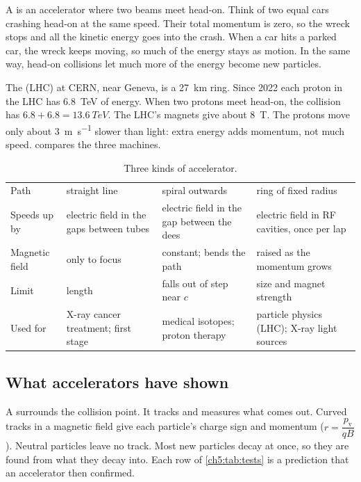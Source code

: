 A  is an accelerator where two beams meet head-on. Think of two equal cars
crashing head-on at the same speed. Their total momentum is zero, so the wreck stops and
all the kinetic energy goes into the crash. When a car hits a parked car, the wreck keeps
moving, so much of the energy stays as motion. In the same way, head-on collisions let
much more of the energy become new particles.

The  (LHC) at CERN, near Geneva, is a \qty{27}{km} ring. Since
2022 each proton in the LHC has \qty{6.8}{TeV} of energy. When two protons meet head-on,
the collision has $6.8 + 6.8 = \qty{13.6}{TeV}$. The LHC's magnets give about \qty{8}{T}.
The protons move only about \qty{3}{m.s^{-1}} slower than light: extra energy adds
momentum, not much speed.  compares the three machines.

\begin{table}
  \caption{Three kinds of accelerator.}\label{ch5:tab:compare}
  \centering
  \small
  \begin{tabular}{@{}L{20mm}L{36mm}L{36mm}L{38mm}@{}}
    \toprule
     &  &  & \\
    \midrule
    Path & straight line & spiral outwards & ring of fixed radius\\
    Speeds up by & electric field in the gaps between tubes & electric field in the gap
      between the dees & electric field in RF cavities, once per lap\\
    Magnetic field & only to focus & constant; bends the path & raised as the momentum
      grows\\
    Limit & length & falls out of step near $c$ & size and magnet strength\\
    Used for & X-ray cancer treatment; first stage & medical isotopes; proton therapy &
      particle physics (LHC); X-ray light sources\\
    \bottomrule
  \end{tabular}
\end{table}

\subsection{What accelerators have shown}

A  surrounds the collision point. It tracks and measures what comes out.
Curved tracks in a magnetic field give each particle's charge sign and momentum
($r = \dfrac{p_\mathrm{v}}{qB}$). Neutral particles leave no track. Most new particles
decay at once, so they are found from what they decay into. Each row of
\cref{ch5:tab:tests} is a prediction that an accelerator then confirmed.


